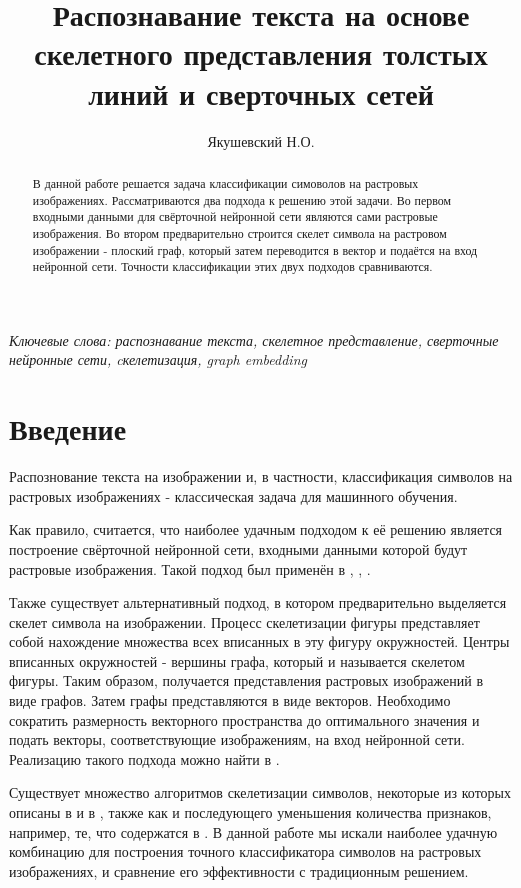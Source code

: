 \documentclass{llncs}
\title{Распознавание текста на основе скелетного представления толстых линий и сверточных сетей }
\author{Якушевский Н.О.}
\institute{Московский физико-технический институт (Государственный университет) \\ 
\email{yakushevskii.no@phystech.edu}}
\begin{document}
\maketitle

\begin{abstract}
	В данной работе решается задача классификации симоволов на растровых изображениях. Рассматриваются два подхода к решению этой задачи. Во первом входными данными для свёрточной нейронной сети являются сами растровые изображения. Во втором предварительно строится скелет символа на растровом изображении - плоский граф, который затем переводится в вектор и подаётся на вход нейронной сети. Точности классификации этих двух подходов сравниваются.
\end{abstract}

\textit{Ключевые слова: распознавание текста, скелетное представление, сверточные нейронные сети, cкелетизация, graph embedding}

\section{Введение}

Распознование текста на изображении и, в частности, классификация символов на растровых изображениях - классическая задача для машинного обучения.

Как правило, считается, что наиболее удачным подходом к её решению является построение свёрточной нейронной сети, входными данными которой будут растровые изображения. Такой подход был применён в \cite{Lecun1998}, \cite{Simard2003}, \cite{Ciresan2011}.

Также существует альтернативный подход, в котором предварительно выделяется скелет символа на изображении. Процесс скелетизации фигуры представляет собой нахождение множества всех вписанных в эту фигуру окружностей. Центры вписанных окружностей - вершины графа, который и называется скелетом фигуры. Таким образом, получается представления растровых изображений в виде графов. Затем графы представляются в виде векторов. Необходимо сократить размерность векторного пространства до оптимального значения и подать векторы, соответствующие изображениям, на вход нейронной сети. Реализацию такого подхода можно найти в \cite{Kushnir2012}.

Существует множество алгоритмов скелетизации символов, некоторые из которых описаны в \cite{Baranov2003} и в \cite{Mestetskiy2009}, также как и последующего уменьшения количества признаков, например, те, что содержатся в \cite{Orlov2016}. В данной работе мы искали наиболее удачную комбинацию для построения точного классификатора символов на растровых изображениях, и сравнение его эффективности с традиционным решением.
\end{document}
